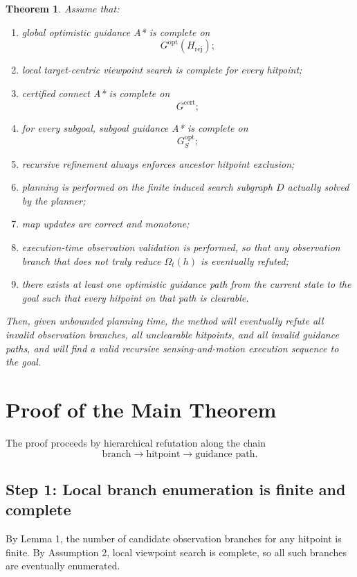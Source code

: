 \documentclass[11pt]{article}
\newtheorem{theorem}{Theorem}
\begin{document}
\begin{theorem}
Assume that:
\begin{enumerate}[leftmargin=2em]
    \item global optimistic guidance A* is complete on
    \[
    G^{\mathrm{opt}}(H_{\mathrm{rej}});
    \]
    \item local target-centric viewpoint search is complete for every hitpoint;
    \item certified connect A* is complete on
    \[
    G^{\mathrm{cert}};
    \]
    \item for every subgoal, subgoal guidance A* is complete on
    \[
    G^{\mathrm{opt}}_S;
    \]
    \item recursive refinement always enforces ancestor hitpoint exclusion;
    \item planning is performed on the finite induced search subgraph $D$ actually solved by the planner;
    \item map updates are correct and monotone;
    \item execution-time observation validation is performed, so that any observation branch that does not truly reduce $\Omega_t(h)$ is eventually refuted;
    \item there exists at least one optimistic guidance path from the current state to the goal such that every hitpoint on that path is clearable.
\end{enumerate}
Then, given unbounded planning time, the method will eventually refute all invalid observation branches, all unclearable hitpoints, and all invalid guidance paths, and will find a valid recursive sensing-and-motion execution sequence to the goal.
\end{theorem}

\section{Proof of the Main Theorem}

The proof proceeds by hierarchical refutation along the chain
\[
\text{branch} \rightarrow \text{hitpoint} \rightarrow \text{guidance path}.
\]

\subsection*{Step 1: Local branch enumeration is finite and complete}

By Lemma 1, the number of candidate observation branches for any hitpoint is finite. By Assumption 2, local viewpoint search is complete, so all such branches are eventually enumerated.
\end{document}
